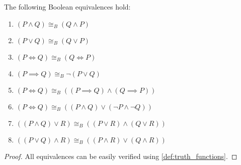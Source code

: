 \begin{proposition}\label{thm:boolean_equivalences}
  The following Boolean equivalences hold:
  \begin{enumerate}
    \item $(P \land Q) \cong_B (Q \land P)$
    \item $(P \lor Q) \cong_B (Q \lor P)$
    \item $(P \iff Q) \cong_B (Q \iff P)$
    \item $(P \implies Q) \cong_B \neg (P \lor Q)$
    \item $(P \iff Q) \cong_B ((P \implies Q) \land (Q \implies P))$
    \item $(P \iff Q) \cong_B ((P \land Q) \lor (\neg P \land \neg Q))$
    \item $((P \land Q) \lor R) \cong_B ((P \lor R) \land (Q \lor R))$
    \item $((P \lor Q) \land R) \cong_B ((P \land R) \lor (Q \land R))$
  \end{enumerate}
\end{proposition}
\begin{proof}
  All equivalences can be easily verified using \cref{def:truth_functions}.
\end{proof}
